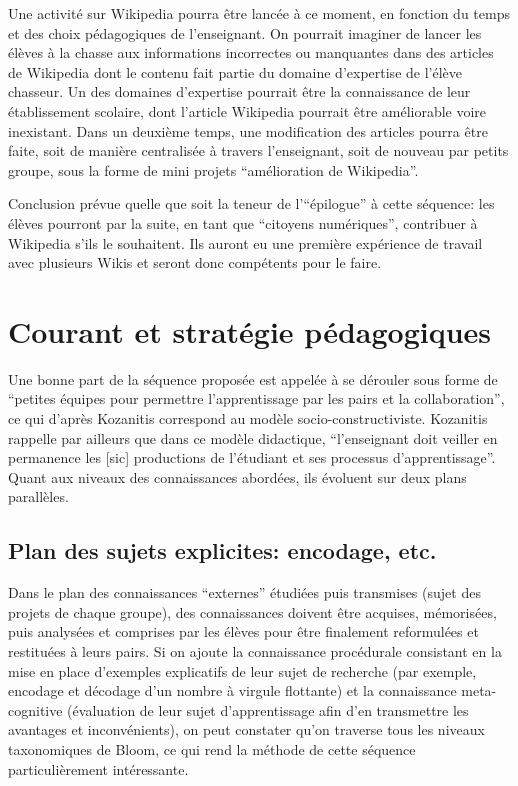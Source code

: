 \documentclass[11pt,bibliography=totoc]{scrartcl}
\begin{document}
Une activité sur Wikipedia pourra être lancée à ce moment, en fonction du temps
et des choix pédagogiques de l'enseignant.  On pourrait imaginer de lancer les
élèves à la chasse aux informations incorrectes ou manquantes dans des articles
de Wikipedia dont le contenu fait partie du domaine d'expertise de l'élève
chasseur. Un des domaines d'expertise pourrait être la connaissance de leur
établissement scolaire, dont l'article Wikipedia pourrait être améliorable voire
inexistant.  Dans un deuxième temps, une modification des articles pourra être
faite, soit de manière centralisée à travers l'enseignant, soit de nouveau par
petits groupe, sous la forme de mini projets ``amélioration de Wikipedia''.

Conclusion prévue quelle que soit la teneur de l'``épilogue'' à cette séquence:
les élèves pourront par la suite, en tant que ``citoyens numériques'',
contribuer à Wikipedia s'ils le souhaitent. Ils auront eu une première
expérience de travail avec plusieurs Wikis et seront donc compétents pour le
faire.

\section{Courant et stratégie pédagogiques}
Une bonne part de la séquence proposée est appelée à se dérouler sous forme de
``petites équipes pour permettre l'apprentissage par les pairs et la
collaboration'', ce qui d'après Kozanitis \cite{kozanitis} correspond au modèle
socio-constructiviste. Kozanitis rappelle par ailleurs que dans ce modèle
didactique, ``l'enseignant doit veiller en permanence les [sic] productions de
l'étudiant et ses processus d'apprentissage''.
Quant aux niveaux des connaissances abordées, ils évoluent sur deux plans
parallèles.

\subsection{Plan des sujets explicites: encodage, etc.}
Dans le plan des connaissances ``externes'' étudiées puis transmises (sujet des
projets de chaque groupe), des connaissances doivent être acquises, mémorisées,
puis analysées et comprises par les élèves pour être finalement reformulées et
restituées à leurs pairs. Si on ajoute la connaissance procédurale consistant en
la mise en place d'exemples explicatifs de leur sujet de recherche (par exemple,
encodage et décodage d'un nombre à virgule flottante) et la connaissance
meta-cognitive (évaluation de leur sujet d'apprentissage afin d'en transmettre
les avantages et inconvénients), on peut constater qu'on traverse tous les
niveaux taxonomiques de Bloom, ce qui rend la méthode de cette séquence
particulièrement intéressante.
\end{document}
